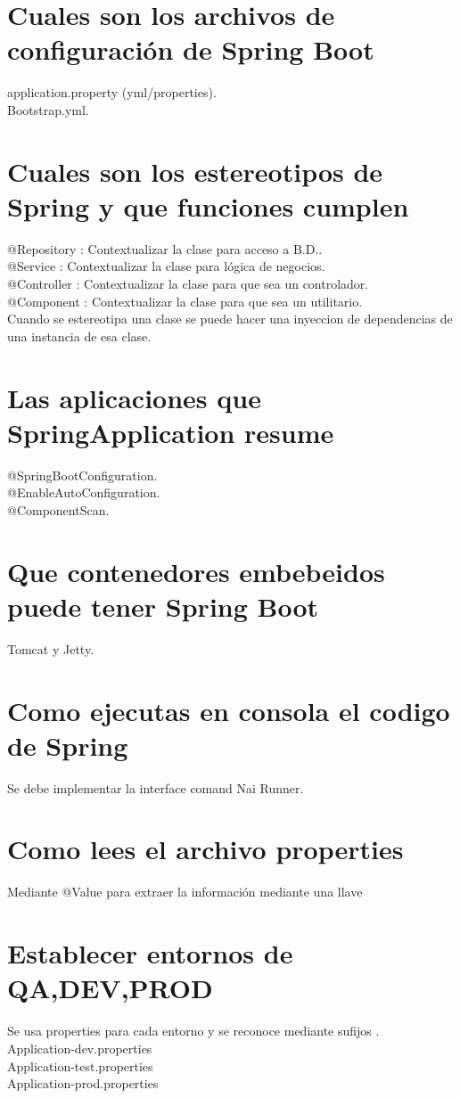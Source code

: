 \section{Cuales son los archivos de configuraci\'on de Spring Boot}
application.property (yml/properties).\\
Bootstrap.yml.
\section{Cuales son los estereotipos de Spring y que funciones cumplen}
@Repository : Contextualizar la clase para acceso a B.D..\\
@Service : Contextualizar la clase para l\'ogica de negocios.\\
@Controller : Contextualizar la clase para que sea un controlador.\\
@Component : Contextualizar la clase para que sea un utilitario.\\
Cuando se estereotipa una clase se puede hacer una inyeccion de dependencias de una instancia
de esa clase.
\section{Las aplicaciones que SpringApplication resume}
@SpringBootConfiguration.\\
@EnableAutoConfiguration.\\
@ComponentScan.
\section{Que contenedores embebeidos puede tener Spring Boot}
Tomcat y Jetty.
\section{Como ejecutas en consola el codigo de Spring}
Se debe implementar la interface comand Nai Runner.
\section{Como lees el archivo properties}
Mediante @Value para extraer la informaci\'on mediante una llave
\section{Establecer entornos de QA,DEV,PROD}
Se usa properties para cada entorno y se reconoce mediante sufijos .\\
Application-dev.properties\\
Application-test.properties\\
Application-prod.properties\\
